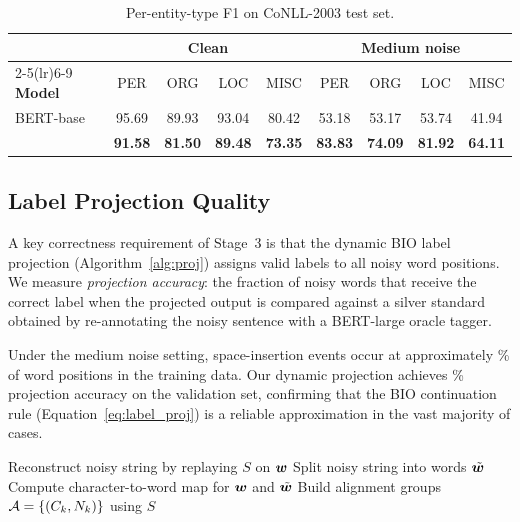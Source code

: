 \begin{table}[h]
\centering
\caption{Per-entity-type F1 on CoNLL-2003 test set.}
\label{tab:entity_type}
\begin{tabular}{lcccccccc}
\toprule
& \multicolumn{4}{c}{\textbf{Clean}} & \multicolumn{4}{c}{\textbf{Medium noise}} \\
\cmidrule(lr){2-5}\cmidrule(lr){6-9}
\textbf{Model} & PER & ORG & LOC & MISC & PER & ORG & LOC & MISC \\
\midrule
BERT-base   & 95.69 & 89.93 & 93.04 & 80.42
            & 53.18 & 53.17 & 53.74 & 41.94 \\
\LightRet{} & \textbf{91.58} & \textbf{81.50} & \textbf{89.48} & \textbf{73.35}
            & \textbf{83.83} & \textbf{74.09} & \textbf{81.92} & \textbf{64.11} \\
\bottomrule
\end{tabular}
\end{table}

\subsection{Label Projection Quality}

A key correctness requirement of Stage~3 is that the dynamic BIO label
projection (Algorithm~\ref{alg:proj}) assigns valid labels to all noisy word
positions.  We measure \emph{projection accuracy}: the fraction of noisy
words that receive the correct label when the projected output is compared
against a silver standard obtained by re-annotating the noisy sentence with a
BERT-large oracle tagger.

Under the medium noise setting, space-insertion events occur at approximately
\% of word positions in the training data.  Our dynamic projection
achieves \% projection accuracy on the validation set, confirming
that the BIO continuation rule (Equation~\ref{eq:label_proj}) is a reliable
approximation in the vast majority of cases.

\begin{algorithm}[h]
\SetAlgoLined
\DontPrintSemicolon
{}
\BlankLine
Reconstruct noisy string by replaying $S$ on $\bm{w}$\;
Split noisy string into words $\tilde{\bm{w}}$\;
Compute character-to-word map for $\bm{w}$ and $\tilde{\bm{w}}$\;
Build alignment groups $\mathcal{A} = \{(C_k, N_k)\}$ using $S$\;
\caption{Dynamic BIO Label Projection}
\label{alg:proj}
\end{algorithm}

